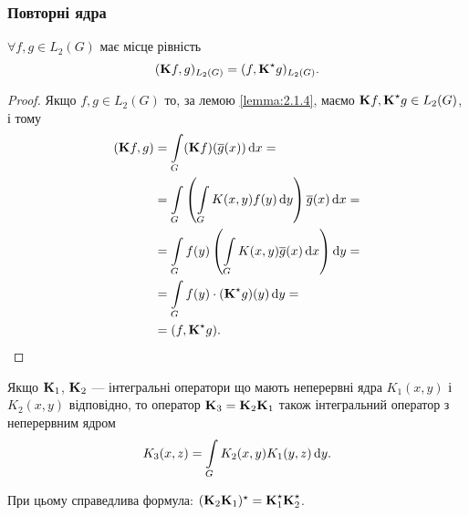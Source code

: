 \subsubsection{Повторні ядра}

\begin{proposition}
	$\forall f, g \in L_2(G)$ має місце рівність 
	\begin{equation}
		(\bf{K}f,g)_{L_2(G)} = (f, \bf{K}^\star g)_{L_2(G)}.
	\end{equation}
\end{proposition}

\begin{proof}
	Якщо $f, g \in L_2(G)$ то, за лемою \ref{lemma:2.1.4}, маємо $\bf{K}f, \bf{K}^\star g \in L_2(G)$, і тому
	\begin{equation}
		\begin{aligned}
			(\bf{K}f, g) &= \Int_G (\bf{K}f)(\overline g(x)) \diff x = \\
			&= \Int_G \left( \Int_G K(x, y) f(y) \diff y\right) \overline{g}(x) \diff x = \\
			&= \Int_G f(y) \left( \Int_G K(x, y) \overline g(x) \diff x\right) \diff y = \\
			&= \Int_G f(y) \cdot (\bf{K}^\star  g)(y) \diff y = \\
			&= (f, \bf{K}^\star g).
		\end{aligned}
	\end{equation}
\end{proof}

\begin{lemma}
	Якщо $\bf{K}_1$, $\bf{K}_2$ --- інтегральні оператори що мають неперервні ядра $K_1(x, y)$ і $K_2(x, y)$ відповідно, то оператор $\bf{K}_3 = \bf{K}_2 \bf{K}_1$ також інтегральний оператор з неперервним ядром
	\begin{equation}
		K_3(x, z) = \Int_G K_2(x, y) K_1(y, z) \diff y.
	\end{equation}
\end{lemma}

\begin{remark}
	При цьому справедлива формула: $(\bf{K}_2 \bf{K}_1)^\star = \bf{K}_1^\star \bf{K}_2^\star$.
\end{remark}

